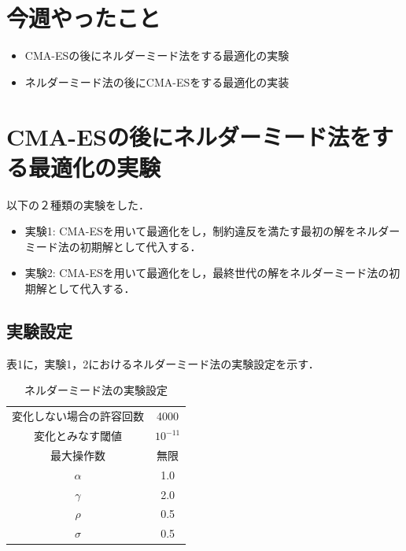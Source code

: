 \documentclass[twocolumn]{jarticle}
\begin{document}


\section{今週やったこと}
	\begin{itemize}
		\item CMA-ESの後にネルダーミード法をする最適化の実験
		\item ネルダーミード法の後にCMA-ESをする最適化の実装
	\end{itemize}

\section{CMA-ESの後にネルダーミード法をする最適化の実験}
	以下の２種類の実験をした．
	\begin{itemize}
		\item 実験1: CMA-ESを用いて最適化をし，制約違反を満たす最初の解をネルダーミード法の初期解として代入する．
		\item 実験2: CMA-ESを用いて最適化をし，最終世代の解をネルダーミード法の初期解として代入する．
	\end{itemize}
	\subsection{実験設定}
		表1に，実験1，2におけるネルダーミード法の実験設定を示す．
		\begin{table}[htbp]	%
			\begin{center}
				\caption{ネルダーミード法の実験設定}
				\begin{tabular}{| c | c |} \hline
					変化しない場合の許容回数 & 4000 \\
					変化とみなす閾値 & $10^{-11}$ \\ 
					最大操作数 & 無限 \\
					$\alpha$ & 1.0 \\
					$\gamma$ & 2.0 \\
					$\rho$ & 0.5 \\
					$\sigma$ & 0.5 \\ \hline
				\end{tabular}
			\end{center}
		\end{table}
		
\end{document}

